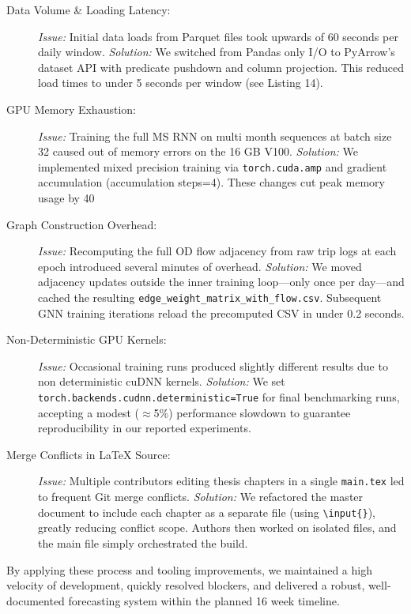 \documentclass{article}
\begin{document}
\begin{description}
  \item[Data Volume \& Loading Latency:]  
    \emph{Issue:} Initial data loads from Parquet files took upwards of 60 seconds per daily window.  
    \emph{Solution:} We switched from Pandas only I/O to PyArrow’s dataset API with predicate pushdown and column projection. This reduced load times to under 5 seconds per window (see Listing 14).
  
  \item[GPU Memory Exhaustion:]  
    \emph{Issue:} Training the full MS RNN on multi month sequences at batch size 32 caused out of memory errors on the 16 GB V100.  
    \emph{Solution:} We implemented mixed precision training via \texttt{torch.cuda.amp} and gradient accumulation (accumulation steps=4). These changes cut peak memory usage by 40%
  
  \item[Graph Construction Overhead:]  
    \emph{Issue:} Recomputing the full OD flow adjacency from raw trip logs at each epoch introduced several minutes of overhead.  
    \emph{Solution:} We moved adjacency updates outside the inner training loop—only once per day—and cached the resulting \texttt{edge\_weight\_matrix\_with\_flow.csv}. Subsequent GNN training iterations reload the precomputed CSV in under 0.2 seconds.
  
  \item[Non‐Deterministic GPU Kernels:]  
    \emph{Issue:} Occasional training runs produced slightly different results due to non deterministic cuDNN kernels.  
    \emph{Solution:} We set \texttt{torch.backends.cudnn.deterministic=True} for final benchmarking runs, accepting a modest ($\approx$5\%) performance slowdown to guarantee reproducibility in our reported experiments.
  
  \item[Merge Conflicts in LaTeX Source:]  
    \emph{Issue:} Multiple contributors editing thesis chapters in a single \texttt{main.tex} led to frequent Git merge conflicts.  
    \emph{Solution:} We refactored the master document to include each chapter as a separate file (using \texttt{\textbackslash input\{\}}), greatly reducing conflict scope. Authors then worked on isolated files, and the main file simply orchestrated the build.
\end{description}

By applying these process and tooling improvements, we maintained a high velocity of development, quickly resolved blockers, and delivered a robust, well‐documented forecasting system within the planned 16 week timeline.
\end{document}
